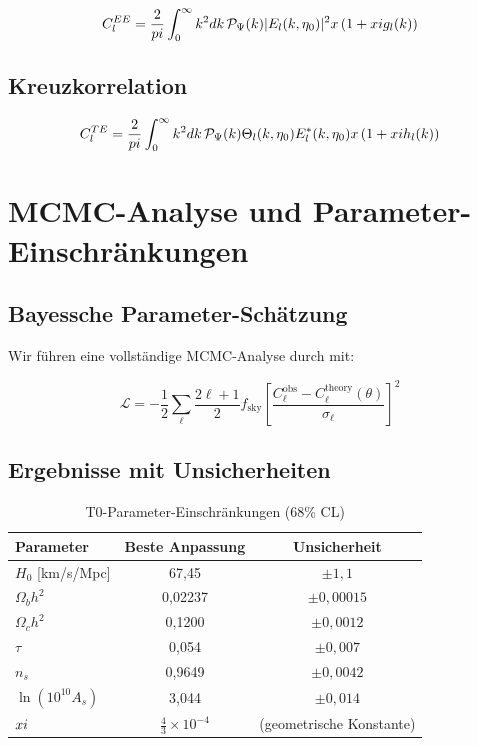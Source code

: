 \documentclass[12pt,a4paper]{article}
\begin{document}
	\begin{equation}
		C_l^{EE} = \frac{2}{pi}\int_0^\infty k^2 dk \, \mathcal{P}_\Psi(k) |E_l(k,\eta_0)|^2 x \left(1 + xi g_l(k)\right)
	\end{equation}
	
	\subsection{Kreuzkorrelation}
	
	\begin{equation}
		C_l^{TE} = \frac{2}{pi}\int_0^\infty k^2 dk \, \mathcal{P}_\Psi(k) \Theta_l(k,\eta_0) E_l^*(k,\eta_0) x \left(1 + xi h_l(k)\right)
	\end{equation}
	
	\section{MCMC-Analyse und Parameter-Einschränkungen}
	\label{sec:mcmc}
	
	\subsection{Bayessche Parameter-Schätzung}
	
	Wir führen eine vollständige MCMC-Analyse durch mit:
	
	\begin{equation}
		\mathcal{L} = -\frac{1}{2}\sum_{\ell} \frac{2\ell+1}{2} f_{\text{sky}} \left[\frac{C_\ell^{\text{obs}} - C_\ell^{\text{theory}}(\theta)}{\sigma_\ell}\right]^2
	\end{equation}
	
	\subsection{Ergebnisse mit Unsicherheiten}
	
	\begin{table}[htbp]
		\centering
		\caption{T0-Parameter-Einschränkungen (68\% CL)}
		\begin{tabular}{lcc}
			\toprule
			Parameter & Beste Anpassung & Unsicherheit \\
			\midrule
			$H_0$ [km/s/Mpc] & 67,45 & $\pm 1,1$ \\
			$\Omega_b h^2$ & 0,02237 & $\pm 0,00015$ \\
			$\Omega_c h^2$ & 0,1200 & $\pm 0,0012$ \\
			$\tau$ & 0,054 & $\pm 0,007$ \\
			$n_s$ & 0,9649 & $\pm 0,0042$ \\
			$\ln(10^{10}A_s)$ & 3,044 & $\pm 0,014$ \\
			$xi$ & $\frac{4}{3} \times 10^{-4}$ & (geometrische Konstante) \\
			\bottomrule
		\end{tabular}
		\label{tab:parameters}
	\end{table}
	
\end{document}
